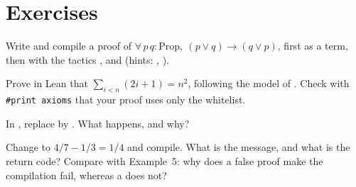 \section{Exercises}\label{appC:sec:exos}

\begin{exercise}
Write and compile a proof of $\forall\,p\,q:\mathrm{Prop},\ (p\vee q)\to(q\vee p)$, first as a term, then with the
tactics ,  and  (hints: , ).
\end{exercise}

\begin{exercise}
Prove in Lean that $\sum_{i<n}(2i+1)=n^2$, following the model of . Check with
\texttt{\#print axioms} that your proof uses only the whitelist.
\end{exercise}

\begin{exercise}
In , replace  by . What happens, and
why?
\end{exercise}

\begin{exercise}
Change  to $4/7-1/3=1/4$ and compile. What is the message, and what is the return code?
Compare with Example~5: why does a false proof make the compilation fail, whereas a  does not?
\end{exercise}
